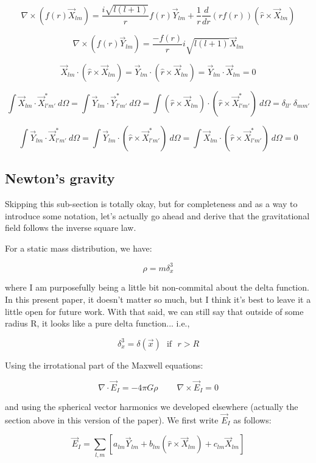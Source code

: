 \documentclass {article}
\begin{document}
$$\nabla \times \left( f(r) \vec X_{lm} \right) = \frac {i \sqrt{l(l+1)} } {r} f(r) \vec Y_{lm} + \frac 1 r \frac d {dr} \left( r f(r) \right) \left( \hat r \times \vec X_{lm} \right)$$

$$\nabla \times \left( f(r) \vec Y_{lm} \right) = \frac {- f(r)} r i \sqrt {l (l+1)} \vec X_{lm}$$

$$ \vec X_{lm} \cdot ( \hat r \times \vec X_{lm}) = \vec Y_{lm} \cdot  ( \hat r \times \vec X_{lm}) = \vec Y_{lm} \cdot \vec X_{lm} = 0$$ 

$$ \int \vec X_{lm} \cdot \vec X_{l' m'}^* ~ d \Omega  = \int \vec Y_{lm} \cdot \vec Y_{l' m'}^* ~ d \Omega  = \int ( \hat r \times \vec X_{lm}) \cdot ( \hat r \times \vec X_{l' m'}^*) ~ d \Omega  = \delta_{ll'} ~ \delta_{m m'} $$

$$\int \vec Y_{lm} \cdot \vec X_{l' m'}^* ~ d \Omega = \int \vec Y_{lm} \cdot ( \hat r \times \vec X_{l' m'}^* ) ~ d \Omega  =  \int \vec X_{lm} \cdot ( \hat r \times \vec X_{l' m'}^* ) ~ d \Omega   = 0 $$

\newpage
\subsection{Newton's gravity}

Skipping this sub-section is totally okay, but for completeness and as a way to introduce some notation, let's actually go ahead and derive that the gravitational field follows the inverse square law. 

For a static mass distribution, we have:

$$\rho = m \delta^3_x  $$

where I am purposefully being a little bit non-commital about the delta function. In this present paper, it doesn't matter so much, but I think it's best to leave it a little open for future work. With that said, we can still say that outside of some radius R, it looks like a pure delta function... i.e.,

$$\delta^3_x = \delta(\vec x) ~~~ \textrm{if} ~~~ r > R $$

Using the irrotational part of the Maxwell equations:

$$\nabla \cdot \vec{E}_I = -4 \pi G \rho ~~~~~~~~~~ \nabla \times \vec{E}_I = 0$$

and using the spherical vector harmonics we developed elsewhere (actually the section above in this version of the paper).  We first write $\vec E_I $ as follows:

$$\vec E_I =  \sum_{l,m} \left[a_{lm}\vec Y_{lm} +b_{lm} (\hat r \times \vec X_{lm}) +c_{lm}\vec X_{lm} \right] $$
\end{document}
